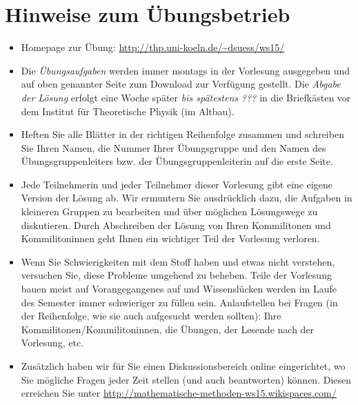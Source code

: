 \documentclass[11pt]{scrartcl}
\begin{document}
\maketitle

\section*{Hinweise zum Übungsbetrieb}
\begin{itemize}
  \item Homepage zur Übung: \url{http://thp.uni-koeln.de/~dsuess/ws15/}
  \item Die \emph{Übungsaufgaben} werden immer montags in der Vorlesung ausgegeben und auf oben genannter Seite zum Download zur Verfügung gestellt. Die \emph{Abgabe der Lösung} erfolgt eine Woche später \emph{bis spätestens ???} in die Briefkästen vor dem Institut für Theoretische Physik (im Altbau).
  \item Heften Sie alle Blätter in der richtigen Reihenfolge zusammen und schreiben Sie Ihren Namen, die Nummer Ihrer Übungsgruppe und den Namen des Übungsgruppenleiters bzw. der Übungsgruppenleiterin auf die erste Seite. 
  \item Jede Teilnehmerin und jeder Teilnehmer dieser Vorlesung gibt eine eigene Version der Lösung ab. Wir ermuntern Sie ausdrücklich dazu, die Aufgaben in kleineren Gruppen zu bearbeiten und über möglichen Lösungswege zu diskutieren. Durch Abschreiben der Lösung von Ihren Kommilitonen und Kommilitoninnen geht Ihnen ein wichtiger Teil der Vorlesung verloren.
  \item Wenn Sie Schwierigkeiten mit dem Stoff haben und etwas nicht verstehen, versuchen Sie, diese Probleme umgehend zu beheben. Teile der Vorlesung bauen meist auf Vorangegangenes auf und Wissenslücken werden im Laufe des Semester immer schwieriger zu füllen sein. Anlaufstellen bei Fragen (in der Reihenfolge, wie sie auch aufgesucht werden sollten): Ihre Kommilitonen/Kommilitoninnen, die Übungen, der Lesende nach der Vorlesung, etc.
  \item Zusätzlich haben wir für Sie einen Diskussionsbereich online eingerichtet, wo Sie mögliche Fragen jeder Zeit stellen (und auch beantworten) können. Diesen erreichen Sie unter \url{http://mathematische-methoden-ws15.wikispaces.com/}
\end{itemize}
\end{document}
